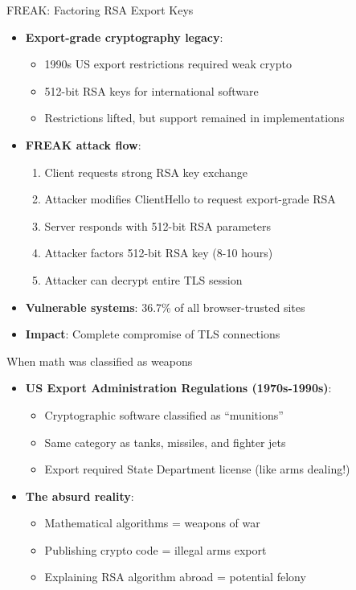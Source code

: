 \documentclass[aspectratio=169, lualatex, handout]{beamer}
\begin{document}
\begin{frame}{FREAK: Factoring RSA Export Keys}
	\begin{itemize}
		\item \textbf{Export-grade cryptography legacy}:
		      \begin{itemize}
			      \item 1990s US export restrictions required weak crypto
			      \item 512-bit RSA keys for international software
			      \item Restrictions lifted, but support remained in implementations
		      \end{itemize}
		\item \textbf{FREAK attack flow}:
		      \begin{enumerate}
			      \item Client requests strong RSA key exchange
			      \item Attacker modifies ClientHello to request export-grade RSA
			      \item Server responds with 512-bit RSA parameters
			      \item Attacker factors 512-bit RSA key (8-10 hours)
			      \item Attacker can decrypt entire TLS session
		      \end{enumerate}
		\item \textbf{Vulnerable systems}: 36.7\% of all browser-trusted sites
		\item \textbf{Impact}: Complete compromise of TLS connections
	\end{itemize}
\end{frame}

\begin{frame}{When math was classified as weapons}
	\begin{itemize}
		\item \textbf{US Export Administration Regulations (1970s-1990s)}:
		      \begin{itemize}
			      \item Cryptographic software classified as ``munitions''
			      \item Same category as tanks, missiles, and fighter jets
			      \item Export required State Department license (like arms dealing!)
		      \end{itemize}
		\item \textbf{The absurd reality}:
		      \begin{itemize}
			      \item Mathematical algorithms = weapons of war
			      \item Publishing crypto code = illegal arms export
			      \item Explaining RSA algorithm abroad = potential felony
		      \end{itemize}
	\end{itemize}
\end{frame}
\end{document}
